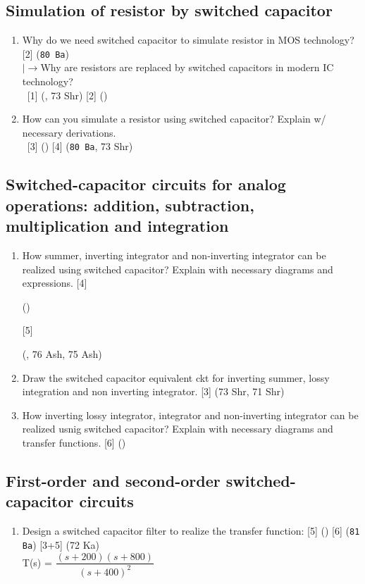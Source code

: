 \documentclass[12pt]{article}
\newcommand{\lb}{\\$\left|\rightarrow\right.$}
\newcommand{\enter}{\\\textcolor{white}{1}}
\begin{document}
	\subsection{Simulation of resistor by switched capacitor}
		\begin{enumerate}[topsep=0pt, noitemsep]
			\item Why do we need switched capacitor to simulate resistor in MOS technology? \hfill[2] (\texttt{80 Ba})
			\lb Why are resistors are replaced by switched capacitors in modern IC technology?
			\enter\hfill [1] (, 73 Shr) [2] ()

			\item How can you simulate a resistor using switched capacitor? Explain w/ necessary derivations.
			\enter \hfill [3] () [4] (\texttt{80 Ba}, 73 Shr)
		\end{enumerate}

	\subsection{Switched-capacitor circuits for analog operations: addition, subtraction, multiplication and integration}
		\begin{enumerate}[topsep=0pt, noitemsep]
			\item How summer, inverting integrator and non-inverting integrator can be realized using switched capacitor? Explain with necessary diagrams and expressions. [4] \begin{footnotesize} () \end{footnotesize} [5] \begin{footnotesize} (, 76 Ash, 75 Ash) \end{footnotesize}			 

			\item Draw the switched capacitor equivalent ckt for inverting summer, lossy integration and non inverting integrator. \hfill [3] (73 Shr, 71 Shr)

			\item How inverting lossy integrator, integrator and non-inverting integrator can be realized usnig switched capacitor? Explain with necessary diagrams and transfer functions. \hfill [6] ()
		\end{enumerate}

	\subsection{First-order and second-order switched-capacitor circuits}
		\begin{enumerate}[topsep=0pt, noitemsep]
			\item Design a switched capacitor filter to realize the transfer function: \hfill [5] () [6] (\texttt{81 Ba}) [3+5] (72 Ka)\\
			T(s) = $\dfrac{(s+200)(s+800)}{(s+400)^2}$
		\end{enumerate}
\end{document}
